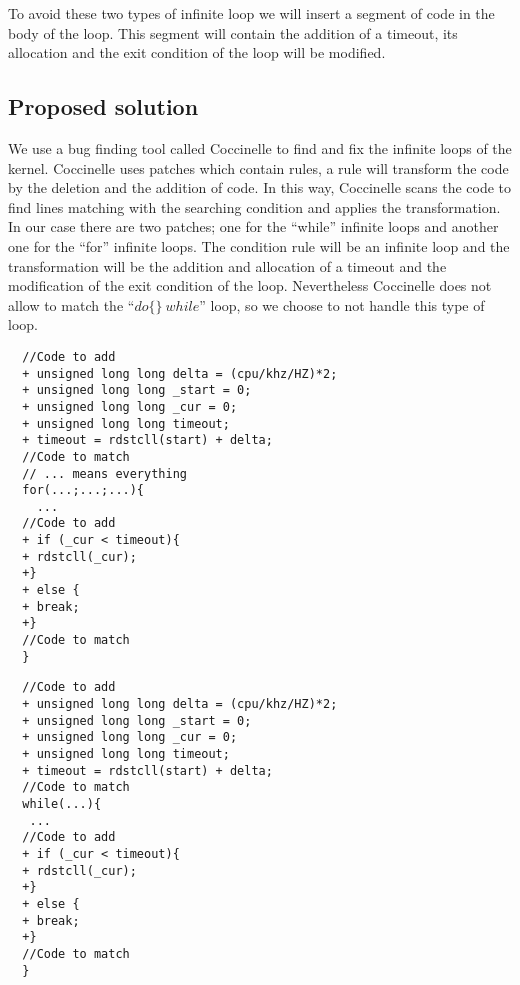 \documentclass[a4paper,12pt]{article}
\begin{document}

To avoid these two types of infinite loop we will insert a segment of code in the body of the loop. This segment will contain the addition of a timeout, its allocation and the exit condition of the loop will be modified.


\subsection{Proposed solution}

 We use a bug finding tool called Coccinelle \cite{Cocci} to find and fix the infinite loops of the kernel. Coccinelle uses patches which contain rules, a rule will transform the code by the deletion and the addition of code. In this way, Coccinelle scans the code to find lines matching with the searching condition and applies the transformation. In our case there are two patches; one for the ``while'' infinite loops and another one for the ``for'' infinite loops. The condition rule will be an infinite loop and the transformation will be the addition and allocation of a timeout and the modification of the exit condition of the loop. Nevertheless Coccinelle does not allow to match the ``$do\{\}\  while$'' loop, so we choose to not handle this type of loop.

\begin{lstlisting}
  //Code to add 
  + unsigned long long delta = (cpu/khz/HZ)*2; 
  + unsigned long long _start = 0; 
  + unsigned long long _cur = 0; 
  + unsigned long long timeout; 
  + timeout = rdstcll(start) + delta; 
  //Code to match 
  // ... means everything
  for(...;...;...){ 
    ...
  //Code to add 
  + if (_cur < timeout){
  + rdstcll(_cur);
  +}
  + else {
  + break;
  +}
  //Code to match
  } 
\end{lstlisting}

\newpage
{}
\begin{lstlisting}
  //Code to add 
  + unsigned long long delta = (cpu/khz/HZ)*2; 
  + unsigned long long _start = 0; 
  + unsigned long long _cur = 0; 
  + unsigned long long timeout; 
  + timeout = rdstcll(start) + delta; 
  //Code to match 
  while(...){ 
   ...
  //Code to add 
  + if (_cur < timeout){
  + rdstcll(_cur);
  +}
  + else {
  + break;
  +}
  //Code to match
  } 
\end{lstlisting}
\end{document}
